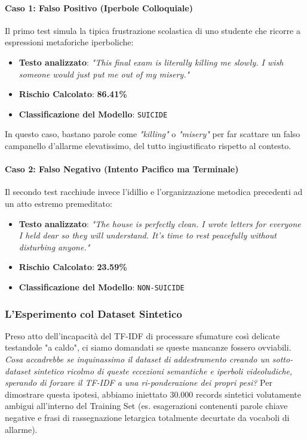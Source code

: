 \paragraph{Caso 1: Falso Positivo (Iperbole Colloquiale)}
Il primo test simula la tipica frustrazione scolastica di uno studente che ricorre a espressioni metaforiche iperboliche:
\begin{itemize}
    \item \textbf{Testo analizzato}: \textit{"This final exam is literally killing me slowly. I wish someone would just put me out of my misery."}
    \item \textbf{Rischio Calcolato}: \textbf{86.41\%}
    \item \textbf{Classificazione del Modello}: \texttt{SUICIDE}
\end{itemize}
In questo caso, bastano parole come \textit{"killing"} o \textit{"misery"} per far scattare un falso campanello d'allarme elevatissimo, del tutto ingiustificato rispetto al contesto.

\paragraph{Caso 2: Falso Negativo (Intento Pacifico ma Terminale)}
Il secondo test racchiude invece l'idillio e l'organizzazione metodica precedenti ad un atto estremo premeditato:
\begin{itemize}
    \item \textbf{Testo analizzato}: \textit{"The house is perfectly clean. I wrote letters for everyone I held dear so they will understand. It's time to rest peacefully without disturbing anyone."}
    \item \textbf{Rischio Calcolato}: \textbf{23.59\%}
    \item \textbf{Classificazione del Modello}: \texttt{NON-SUICIDE}
\end{itemize}

\subsubsection{L'Esperimento col Dataset Sintetico}
Preso atto dell'incapacità del TF-IDF di processare sfumature così delicate testandole "a caldo", ci siamo domandati se queste mancanze fossero ovviabili. \textit{Cosa accadrebbe se inquinassimo il dataset di addestramento creando un sotto-dataset sintetico ricolmo di queste eccezioni semantiche e iperboli videoludiche, sperando di forzare il TF-IDF a una ri-ponderazione dei propri pesi?}
Per dimostrare questa ipotesi, abbiamo iniettato 30.000 records sintetici volutamente ambigui all'interno del Training Set (es. esagerazioni contenenti parole chiave negative e frasi di rassegnazione letargica totalmente decurtate da vocaboli di allarme).


